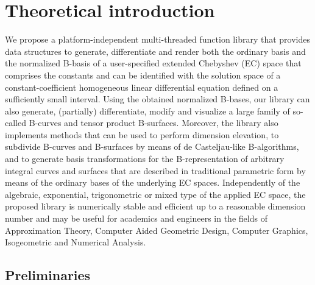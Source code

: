 \documentclass[b5paper, twosided]{book}
\begin{document}
\chapter{Theoretical introduction}

We propose a platform-independent multi-threaded function library that provides data structures to generate, differentiate and render both the ordinary basis and the normalized B-basis of a user-specified extended Chebyshev (EC) space that comprises the constants and can be identified with the solution space of a constant-coefficient homogeneous linear differential equation defined on a sufficiently small interval. Using the obtained normalized B-bases, our library can also generate, (partially) differentiate, modify and visualize a large family of so-called B-curves and tensor product B-surfaces. Moreover, the library also implements methods that can be used to perform dimension elevation, to subdivide B-curves and B-surfaces by means of de Casteljau-like B-algorithms, and to generate basis transformations for the B-representation of arbitrary integral curves and surfaces that  are described in traditional parametric form by means of the ordinary bases of the underlying EC spaces. Independently of the algebraic, exponential, trigonometric or mixed type of the applied EC space, the proposed library is numerically stable and efficient up to a reasonable dimension number and may be useful for academics and engineers in the fields of Approximation Theory, Computer Aided Geometric Design, Computer Graphics, Isogeometric and Numerical Analysis.


\section{Preliminaries}\label{sec:introduction}
\end{document}
